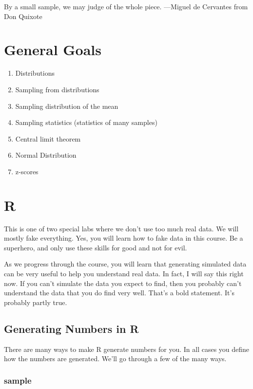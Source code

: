 \documentclass[
]{book}
\providecommand{\tightlist}{%
  \setlength{\itemsep}{0pt}\setlength{\parskip}{0pt}}
\begin{document}
{
By a small sample, we may judge of the whole piece.
---Miguel de Cervantes from Don Quixote
}

\hypertarget{general-goals-3}{%
\section{General Goals}\label{general-goals-3}}

\begin{enumerate}
\def\labelenumi{\arabic{enumi}.}
\tightlist
\item
  Distributions
\item
  Sampling from distributions
\item
  Sampling distribution of the mean
\item
  Sampling statistics (statistics of many samples)
\item
  Central limit theorem
\item
  Normal Distribution
\item
  z-scores
\end{enumerate}

\hypertarget{r-4}{%
\section{R}\label{r-4}}

This is one of two special labs where we don't use too much real data. We will mostly fake everything. Yes, you will learn how to fake data in this course. Be a superhero, and only use these skills for good and not for evil.

As we progress through the course, you will learn that generating simulated data can be very useful to help you understand real data. In fact, I will say this right now. If you can't simulate the data you expect to find, then you probably can't understand the data that you do find very well. That's a bold statement. It's probably partly true.

\hypertarget{generating-numbers-in-r}{%
\subsection{Generating Numbers in R}\label{generating-numbers-in-r}}

There are many ways to make R generate numbers for you. In all cases you define how the numbers are generated. We'll go through a few of the many ways.

\hypertarget{sample}{%
\subsubsection{sample}\label{sample}}
\end{document}
